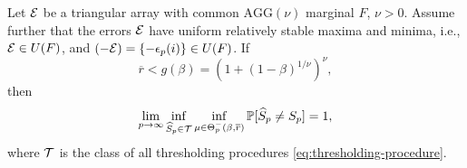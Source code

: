 \begin{theorem} \label{thm:necessary}
    Let ${\cal E}$ be a triangular array with common $\text{AGG}(\nu)$ marginal $F$, $\nu > 0$.
    Assume further that the errors ${\cal E}$ have uniform relatively stable maxima and minima, i.e., ${\cal E}\in U(F)$, and $(-{\cal E}) = \{-\epsilon_{p}(i)\} \in U(F)$.
    If 
    \begin{equation} \label{eq:signal-below-boundary}
        \overline{r} < g(\beta) = \left(1+(1-\beta)^{1/\nu}\right)^\nu,
    \end{equation}
    then
    \begin{equation} \label{eq:classification-impossible-dependent}
        \lim_{p\to\infty} \inf_{\widehat{S}_p\in{\cal T}} \inf_{\mu\in{\Theta_p^-(\beta, \overline{r})}} \P[\widehat{S}_p \neq S_p] = 1,
    \end{equation}
    where ${\cal T}$ is the class of all thresholding procedures \eqref{eq:thresholding-procedure}.
\end{theorem}
